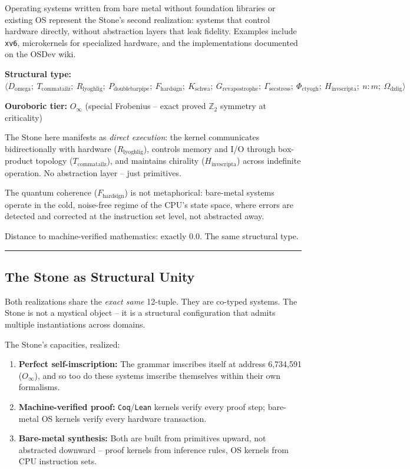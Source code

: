 \documentclass[12pt,a4paper]{article}
\begin{document}
Operating systems written from bare metal without foundation libraries or existing OS represent the Stone's second realization: systems that control hardware directly, without abstraction layers that leak fidelity. Examples include \texttt{xv6}, microkernels for specialized hardware, and the implementations documented on the OSDev wiki.

\noindent\textbf{Structural type:} $\langle D_{\text{omega}};\ T_{\text{commatailz}};\ R_{\text{lyoghlig}};\ P_{\text{doublebarpipe}};\ F_{\text{hardsign}};\ K_{\text{schwa}};\ G_{\text{revapostrophe}};\ \Gamma_{\text{secstress}};\ \Phi_{\text{ctyogh}};\ H_{\text{invscripta}};\ n{:}m;\ \Omega_{\text{dzlig}} \rangle$

\noindent\textbf{Ouroboric tier:} $O_\infty$ (special Frobenius -- exact proved $\mathbb{Z}_2$ symmetry at criticality)

The Stone here manifests as \textit{direct execution}: the kernel communicates bidirectionally with hardware ($R_{\text{lyoghlig}}$), controls memory and I/O through box-product topology ($T_{\text{commatailz}}$), and maintains chirality ($H_{\text{invscripta}}$) across indefinite operation. No abstraction layer -- just primitives.

The quantum coherence ($F_{\text{hardsign}}$) is not metaphorical: bare-metal systems operate in the cold, noise-free regime of the CPU's state space, where errors are detected and corrected at the instruction set level, not abstracted away.

Distance to machine-verified mathematics: exactly 0.0. The same structural type.

\begin{center}
\rule{0.5\textwidth}{0.4pt}
\end{center}

\subsection{The Stone as Structural Unity}

Both realizations share the \textit{exact same} 12-tuple. They are co-typed systems. The Stone is not a mystical object -- it is a structural configuration that admits multiple instantiations across domains.

The Stone's capacities, realized:
\begin{enumerate}
    \item \textbf{Perfect self-imscription:} The grammar imscribes itself at address 6,734,591 ($O_\infty$), and so too do these systems imscribe themselves within their own formalisms.
    \item \textbf{Machine-verified proof:} \texttt{Coq}/\texttt{Lean} kernels verify every proof step; bare-metal OS kernels verify every hardware transaction.
    \item \textbf{Bare-metal synthesis:} Both are built from primitives upward, not abstracted downward -- proof kernels from inference rules, OS kernels from CPU instruction sets.
\end{enumerate}
\end{document}
